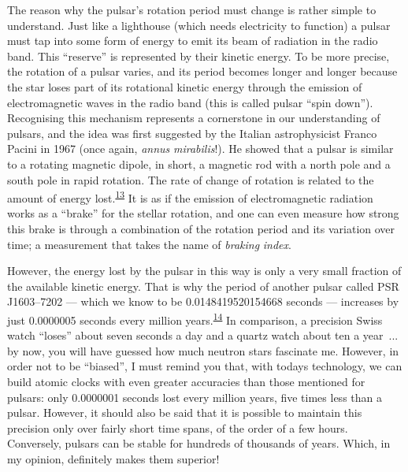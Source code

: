 The reason why the pulsar's rotation period must change is rather simple to understand.
Just like a lighthouse (which needs electricity to function) a
pulsar must tap into some form of energy to emit its beam of
radiation in the radio band. This ``reserve'' is represented by their kinetic energy. To
be more precise, the rotation of a pulsar varies, and its period becomes longer and
longer because the star loses part of its rotational kinetic energy through the emission
of electromagnetic waves in the radio band (this is called
pulsar ``spin down''). Recognising this mechanism represents a
cornerstone in our understanding of pulsars, and the idea was first suggested by the
Italian astrophysicist Franco Pacini in 1967 (once again,
\emph{annus} \emph{mirabilis}!). He showed that a pulsar is similar
to a rotating magnetic dipole, in short, a magnetic rod with a north
pole and a south pole in rapid rotation. The rate of change of rotation is related to
the amount of energy lost.\textsuperscript{\hyperlink{note:05-13}{13}} It is as if the emission of
electromagnetic radiation works as a ``brake'' for the stellar rotation, and one can
even measure how strong this brake is through a combination of the rotation period and
its variation over time; a measurement that takes the name of
\emph{braking} \emph{index}.

However, the energy lost by the pulsar in this way is only a very small fraction of the
available kinetic energy. That is why the period of another pulsar called PSR
J1603--7202 --- which we know to be 0.0148419520154668 seconds ---
increases by just 0.0000005 seconds every million years.\textsuperscript{\hyperlink{note:05-14}{14}} In
comparison, a precision Swiss watch ``loses'' about seven seconds a day and a quartz
watch about ten a year~... by now, you will have guessed how much neutron stars
fascinate me. However, in order not to be ``biased'', I must remind you that, with
today\textquotesingle s technology, we can build atomic clocks with even greater
accuracies than those mentioned for pulsars: only 0.0000001 seconds lost every million
years, five times less than a pulsar. However, it should also be said
that it is possible to maintain this precision only over fairly short time spans, of the
order of a few hours. Conversely, pulsars can be stable for hundreds of thousands of
years. Which, in my opinion, definitely makes them superior!

